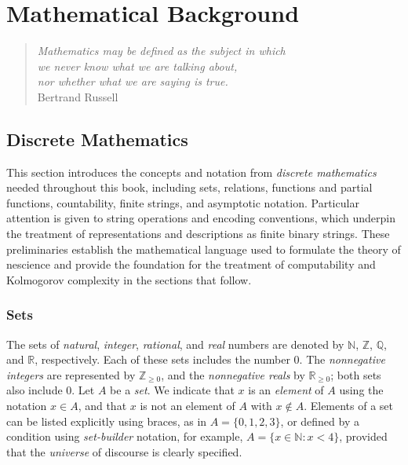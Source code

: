 %
%


\chapter{Mathematical Background}
\label{chap:Mathematical_Background}

\begin{quote}
\begin{flushright}
\emph{Mathematics may be defined as the subject in which\\
we never know what we are talking about,\\
nor whether what we are saying is true.}\\
Bertrand Russell
\end{flushright}
\end{quote}
\bigskip

%
%

\section{Discrete Mathematics}

This section introduces the concepts and notation from \emph{discrete mathematics} needed throughout this book, including sets, relations, functions and partial functions, countability, finite strings, and asymptotic notation. Particular attention is given to string operations and encoding conventions, which underpin the treatment of representations and descriptions as finite binary strings. These preliminaries establish the mathematical language used to formulate the theory of nescience and provide the foundation for the treatment of computability and Kolmogorov complexity in the sections that follow.


\subsection*{Sets}
\label{sec:sets}

The sets of \emph{natural}, \emph{integer}, \emph{rational}, and \emph{real} numbers are denoted by $\mathbb{N}$, $\mathbb{Z}$, $\mathbb{Q}$, and $\mathbb{R}$, respectively. Each of these sets includes the number $0$. The \emph{nonnegative integers} are represented by $\mathbb{Z}_{\geq 0}$, and the \emph{nonnegative reals} by $\mathbb{R}_{\geq 0}$; both sets also include $0$. Let $A$ be a \emph{set}. We indicate that $x$ is an \emph{element} of $A$ using the notation $x \in A$, and that $x$ is not an element of $A$ with $x \notin A$. Elements of a set can be listed explicitly using braces, as in $A = \{0, 1, 2, 3\}$, or defined by a condition using \emph{set-builder} notation, for example, $A = \{x \in \mathbb{N} : x < 4\}$, provided that the \emph{universe} of discourse is clearly specified.

